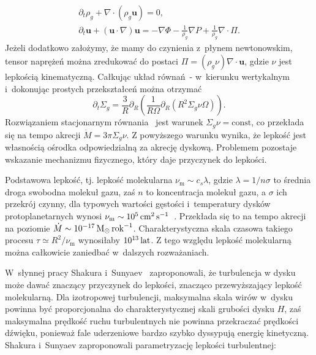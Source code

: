 \begin{gather}
   \partial_t \rho_g + \nabla\cdot\left(\rho_g\mathbf{u}\right) = 0,
   \label{eq:ns1}\\
\partial_t \mathbf{u} + \left(\mathbf{u}\cdot\nabla\right)\mathbf{u} = 
-\nabla\Phi -\frac{1}{\rho_g} \nabla P + \frac{1}{\rho_g} \nabla \cdot \Pi.
\label{eq:ns2}
\end{gather}
%
Jeżeli dodatkowo założymy, że mamy do czynienia z~płynem newtonowskim, tensor
naprężeń można zredukować do postaci $\Pi = (\rho_g \nu)\nabla\cdot\mathbf{u}$,
gdzie $\nu$ jest lepkością kinematyczną. Całkując układ
równań~- w~kierunku wertykalnym i~dokonując prostych
przekształceń można otrzymać
\begin{equation}\label{eq:sigma}
   \partial_t \Sigma_g =
   \frac{3}{R}\partial_R\left(\frac{1}{R\Omega}\partial_R\left(R^2\Sigma_g \nu
         \Omega\right)\right).
\end{equation}
Rozwiązaniem stacjonarnym równania~ jest warunek $\Sigma_g\nu =
\textrm{const}$, co przekłada się na tempo akrecji $\dot{M} = 3\pi\Sigma_g\nu$.
Z powyższego warunku wynika, że lepkość jest własnością ośrodka odpowiedzialną
za akrecję dyskową. Problemem pozostaje wskazanie mechanizmu fizycznego, który
daje przyczynek do lepkości.
\par Podstawowa lepkość, tj. lepkość molekularna $\nu_{\textrm{m}} \sim c_s
\lambda$, gdzie $\lambda = 1 / n\sigma$ to średnia droga swobodna molekuł gazu,
zaś $n$ to koncentracja molekuł gazu, a $\sigma$ ich przekrój czynny, dla
typowych wartości gęstości i~temperatury dysków protoplanetarnych wynosi
$\nu_{\textrm{m}}\sim10^5\hbox{$\thinspace\textrm{cm}$}^2\hbox{$\thinspace\textrm{s}$}^{-1}$~\cite{armitage}. Przekłada się to na
tempo akrecji na poziomie $\dot{M}\sim 10^{-17}\hbox{$\mathrm{\thinspace M_{\odot}}$}\hbox{$\thinspace\textrm{rok}$}^{-1}$. 
Charakterystyczna skala czasowa takiego procesu $\tau \simeq R^2 /
\nu_{\textrm{m}}$ wynosiłaby $10^{13}\hbox{$\thinspace\textrm{lat}$}$. Z tego względu lepkość molekularną można
całkowicie zaniedbać w~dalszych rozważaniach.
\par W~słynnej pracy Shakura i~Sunyaev~\citep{SS73} zaproponowali, że turbulencja
w dysku może dawać znaczący przyczynek do lepkości, znacząco przewyższający
lepkość molekularną. Dla izotropowej turbulencji, maksymalna skala wirów w~dysku
powinna być proporcjonalna do charakterystycznej skali grubości dysku $H$, zaś
maksymalna prędkość ruchu turbulentnych nie powinna przekraczać prędkości
dźwięku, ponieważ fale uderzeniowe bardzo szybko dyssypują energię kinetyczną.
Shakura i~Sunyaev zaproponowali parametryzację lepkości turbulentnej:

